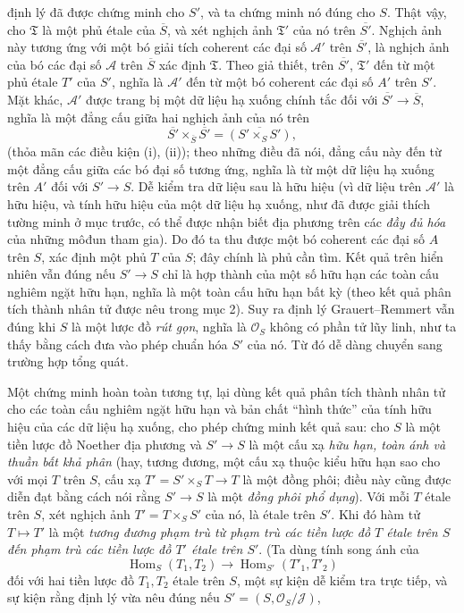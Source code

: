 \documentclass[11pt,twoside,openany]{book}
\numberwithin{equation}{section}
\newcommand{\src}[1]{%
  \phantomsection\hypertarget{src:\fgasourceid:#1}{}%
  \marginpar{\raggedleft\footnotesize\sffamily #1}%
}
\newcommand{\fgasourceid}{unset}
\begin{document}
\src{309}
định lý đã được chứng minh cho $S'$, và ta chứng minh nó đúng cho $S$. Thật vậy,
cho $\mathfrak T$ là một phủ étale của $\overline S$, và xét nghịch ảnh
$\mathfrak T'$ của nó trên $\overline{S'}$. Nghịch ảnh này tương ứng với một bó
giải tích coherent các đại số $\mathcal A'$ trên $\overline{S'}$, là nghịch ảnh
của bó các đại số $\mathcal A$ trên $\overline S$ xác định $\mathfrak T$. Theo giả
thiết, trên $\overline{S'}$, $\mathfrak T'$ đến từ một phủ étale $T'$ của $S'$,
nghĩa là $\mathcal A'$ đến từ một bó coherent các đại số $A'$ trên $S'$. Mặt
khác, $\mathcal A'$ được trang bị một dữ liệu hạ xuống chính tắc đối với
$\overline{S'}\longrightarrow\overline S$, nghĩa là một đẳng cấu giữa hai
nghịch ảnh của nó trên
\[
  \overline{S'}\times_{\overline S}\overline{S'}
  =\overline{(S'\times_SS')},
\]
(thỏa mãn các điều kiện (i), (ii)); theo những điều đã nói, đẳng cấu này đến từ
một đẳng cấu giữa các bó đại số tương ứng, nghĩa là từ một dữ liệu hạ xuống
trên $A'$ đối với $S'\longrightarrow S$. Dễ kiểm tra dữ liệu sau là hữu hiệu
(vì dữ liệu trên $\mathcal A'$ là hữu hiệu, và tính hữu hiệu của một dữ liệu hạ
xuống, như đã được giải thích tường minh ở mục trước, có thể được nhận biết địa
phương trên các \emph{đầy đủ hóa} của những môđun tham gia). Do đó ta thu
được một bó coherent các đại số $A$ trên $S$, xác định một phủ $T$ của $S$;
đây chính là phủ cần tìm. Kết quả trên hiển nhiên vẫn đúng nếu
$S'\longrightarrow S$ chỉ là hợp thành của một số hữu hạn các toàn cấu nghiêm
ngặt hữu hạn, nghĩa là một toàn cấu hữu hạn bất kỳ (theo kết quả phân tích thành
nhân tử được nêu trong mục 2). Suy ra định lý Grauert--Remmert vẫn đúng khi $S$
là một lược đồ \emph{rút gọn}, nghĩa là $\mathcal O_S$ không có phần tử lũy
linh, như ta thấy bằng cách đưa vào phép chuẩn hóa $S'$ của nó. Từ đó dễ dàng
chuyển sang trường hợp tổng quát.

Một chứng minh hoàn toàn tương tự, lại dùng kết quả phân tích thành nhân tử cho
các toàn cấu nghiêm ngặt hữu hạn và bản chất ``hình thức'' của tính hữu hiệu của
các dữ liệu hạ xuống, cho phép chứng minh kết quả sau: cho $S$ là một tiền lược
đồ Noether địa phương và $S'\longrightarrow S$ là một cấu xạ \emph{hữu hạn,
toàn ánh và thuần bất khả phân} (hay, tương đương, một cấu xạ thuộc kiểu hữu hạn
sao cho với mọi $T$ trên $S$, cấu xạ
$T'=S'\times_ST\longrightarrow T$ là một đồng phôi; điều này cũng được diễn đạt
bằng cách nói rằng $S'\longrightarrow S$ là một \emph{đồng phôi phổ dụng}). Với
mỗi $T$ étale trên $S$, xét nghịch ảnh $T'=T\times_SS'$ của nó, là étale trên
$S'$. Khi đó hàm tử $T\longmapsto T'$ là một \emph{tương đương phạm trù từ
phạm trù các tiền lược đồ $T$ étale trên $S$ đến phạm trù các tiền lược đồ $T'$
étale trên $S'$}. (Ta dùng tính song ánh của
\[
  \operatorname{Hom}_S(T_1,T_2)\longrightarrow
  \operatorname{Hom}_{S'}(T'_1,T'_2)
\]
đối với hai tiền lược đồ $T_1,T_2$ étale trên $S$, một sự kiện dễ kiểm tra trực
tiếp, và sự kiện rằng định lý vừa nêu đúng nếu
$S'=(S,\mathcal O_S/\mathcal J)$,
\end{document}
